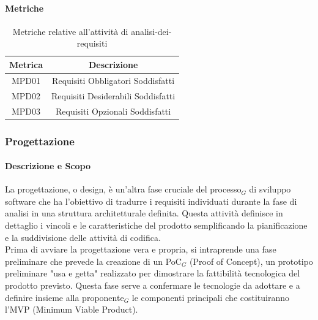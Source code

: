 \documentclass[10pt]{article}
\begin{document}
\begin{justify}
        \paragraph{Metriche}
        \begin{table}[H]
          \centering
          \begin{tabular}{|c|c|}
            \hline
            \textbf{Metrica} & \textbf{Descrizione} \\
            \hline
            MPD01 & Requisiti Obbligatori Soddisfatti\\
            \hline
            MPD02 & Requisiti Desiderabili Soddisfatti\\
            \hline
            MPD03 & Requisiti Opzionali Soddisfatti\\
            \hline
          \end{tabular}
          \caption{Metriche relative all'attività di analisi-dei-requisiti}
        \end{table}

    \subsubsection{Progettazione}
    \label{progettazione}
        \paragraph{Descrizione e Scopo}
        La progettazione, o design, è un'altra fase cruciale del processo$_G$ di sviluppo software che ha l'obiettivo di tradurre i requisiti individuati durante la fase di analisi in una struttura architetturale definita. Questa attività definisce in dettaglio i vincoli e le caratteristiche del prodotto semplificando la pianificazione e la suddivisione delle attività di codifica.\\
        Prima di avviare la progettazione vera e propria, si intraprende una fase preliminare che prevede la creazione di un PoC$_G$ (Proof of Concept), un prototipo preliminare "usa e getta" realizzato per dimostrare la fattibilità tecnologica del prodotto previsto. Questa fase serve a confermare le tecnologie da adottare e a definire insieme alla proponente$_G$ le componenti principali che costituiranno l'MVP (Minimum Viable Product).\\


\end{justify}
\end{document}
